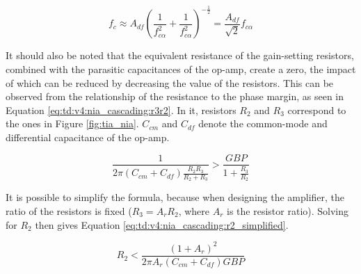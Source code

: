\begin{equation}\label{eq:td:v4:nia_cascading}
	f_c \approx A_{df}\left(\frac{1}{f_{c\alpha}^2} + \frac{1}{f_{c\alpha}^2}\right)^{-\frac{1}{2}} = \frac{A_{df}}{\sqrt{2}}f_{c\alpha}
\end{equation}

It should also be noted that the equivalent resistance of the gain-setting resistors, combined with the parasitic capacitances of the op-amp, create a zero, the impact of which can be reduced by decreasing the value of the resistors. This can be observed from the relationship of the resistance to the phase margin, as seen in Equation \eqref{eq:td:v4:nia_cascading:r3r2}. In it, resistors $R_2$ and $R_3$ correspond to the ones in Figure \ref{fig:tia_nia}. $C_{cm}$ and $C_{df}$ denote the common-mode and differential capacitance of the op-amp.

\begin{equation}\label{eq:td:v4:nia_cascading:r3r2}
	\frac{1}{2\pi\left(C_{cm} + C_{df}\right)\frac{R_2R_3}{R_2 + R_3}} > \frac{GBP}{1 + \frac{R_3}{R_2}}
\end{equation}

It is possible to simplify the formula, because when designing the amplifier, the ratio of the resistors is fixed ($R_3 = A_rR_2$, where $A_r$ is the resistor ratio). Solving for $R_2$ then gives Equation \ref{eq:td:v4:nia_cascading:r2_simplified}.

\begin{equation}\label{eq:td:v4:nia_cascading:r2_simplified}
	R_2 < \frac{(1 + A_r)^2}{2\pi A_r\left(C_{cm} + C_{df}\right)GBP} 
\end{equation}



